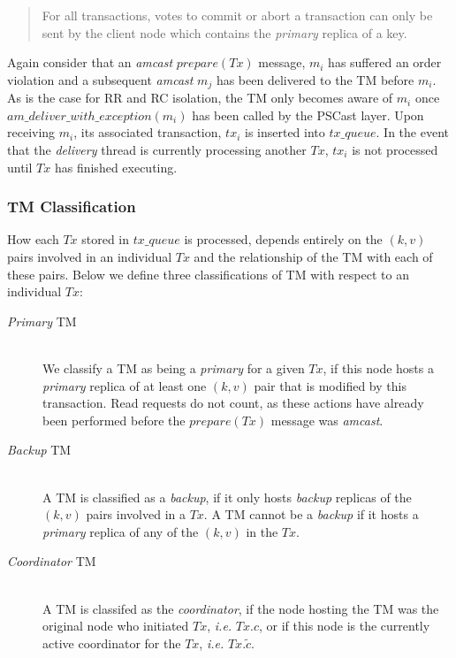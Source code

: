 \begin{quotation}    
    For all transactions, votes to commit or abort a transaction can only be sent by the client node which contains the \emph{primary} replica of a key.  
\end{quotation}

    Again consider that an \emph{amcast} $prepare(Tx)$ message, $m_i$ has suffered an order violation and a subsequent \emph{amcast} $m_j$ has been delivered to the TM before $m_i$.  As is the case for RR and RC isolation, the TM only becomes aware of $m_i$ once $am\_deliver\_with\_exception(m_i)$ has been called by the \textsf{PSCast} layer.  Upon receiving $m_i$, its associated transaction, $tx_i$ is inserted into $tx\_queue$.  In the event that the \emph{delivery} thread is currently processing another $Tx$, $tx_i$ is not processed until $Tx$ has finished executing.  
    
    \subsubsection*{TM Classification}    
    How each $Tx$ stored in $tx\_queue$ is processed, depends entirely on the $(k,v)$ pairs involved in an individual $Tx$ and the relationship of the TM with each of these pairs.  Below we define three classifications of TM with respect to an individual $Tx$:
    
    \begin{description}
        \item[\emph{Primary} TM] \hfill \\
            We classify a TM as being a \emph{primary} for a given $Tx$, if this node hosts a \emph{primary} replica of at least one $(k,v)$ pair that is modified by this transaction.  Read requests do not count, as these actions have already been performed before the $prepare(Tx)$ message was \emph{amcast}.  
            
        \item[\emph{Backup} TM] \hfill \\
        A TM is classified as a \emph{backup}, if it only hosts \emph{backup} replicas of the $(k, v)$ pairs involved in a $Tx$.  A TM cannot be a \emph{backup} if it hosts a \emph{primary} replica of any of the $(k,v)$ in the $Tx$.  
        
        \item[\emph{Coordinator} TM] \hfill \\
        A TM is classifed as the \emph{coordinator}, if the node hosting the TM was the original node who initiated $Tx$, \emph{i.e.} $Tx.c$, or if this node is the currently active coordinator for the $Tx$, \emph{i.e.} $Tx.\tilde{c}$.  
    \end{description}
    
